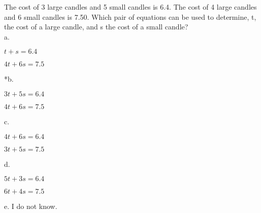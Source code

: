 
The cost of 3 large candles and 5 small candles is 6.4. The cost of 4 large candles and 6 small candles is 7.50. Which pair of equations can be used to determine, t, the cost of a large candle, and s the cost of a small candle?\\

a. 

\begin{center}
    \( t + s = 6.4 \)

    \( 4t + 6s = 7.5 \)
\end{center}

*b. 

\begin{center}
    \( 3t + 5s = 6.4 \)

    \( 4t + 6s = 7.5 \)
\end{center}

c. 

\begin{center}
    \( 4t + 6s = 6.4 \)

    \( 3t + 5s = 7.5 \)
\end{center}  

d. 

\begin{center}
    \( 5t + 3s = 6.4 \)

    \( 6t + 4s = 7.5 \)
\end{center}

e. I do not know.\\
